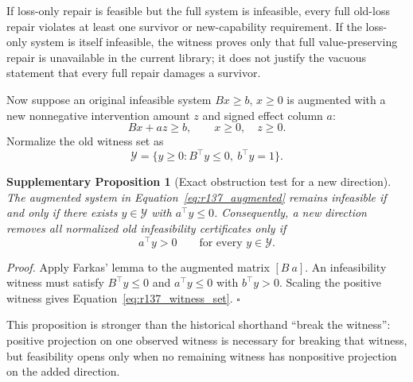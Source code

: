 \documentclass[11pt,letterpaper]{article}
\theoremstyle{plain}
\newtheorem{proposition}{Supplementary Proposition}
\newcommand{\1}{\mathbf 1}
\begin{document}
If loss-only repair is feasible but the full system is infeasible, every full old-loss repair violates at least one survivor or new-capability requirement. If the loss-only system is itself infeasible, the witness proves only that full value-preserving repair is unavailable in the current library; it does not justify the vacuous statement that every full repair damages a survivor.

Now suppose an original infeasible system $Bx\ge b$, $x\ge0$ is augmented with a new nonnegative intervention amount $z$ and signed effect column $a$:
\begin{equation}
 Bx+az\ge b,\qquad x\ge0,\quad z\ge0.
\label{eq:r137_augmented}
\end{equation}
Normalize the old witness set as
\begin{equation}
 \mathcal Y=\{y\ge0:B^\top y\le0,\ b^\top y=1\}.
\label{eq:r137_witness_set}
\end{equation}

\begin{proposition}[Exact obstruction test for a new direction]
The augmented system in Equation~\ref{eq:r137_augmented} remains infeasible if and only if there exists $y\in\mathcal Y$ with $a^\top y\le0$. Consequently, a new direction removes all normalized old infeasibility certificates only if
\begin{equation}
 a^\top y>0\qquad\text{for every }y\in\mathcal Y.
\label{eq:r137_break_all_witnesses}
\end{equation}
\end{proposition}
\textit{Proof.} Apply Farkas' lemma to the augmented matrix $[B\ a]$. An infeasibility witness must satisfy $B^\top y\le0$ and $a^\top y\le0$ with $b^\top y>0$. Scaling the positive witness gives Equation~\ref{eq:r137_witness_set}. $\square$

This proposition is stronger than the historical shorthand ``break the witness'': positive projection on one observed witness is necessary for breaking that witness, but feasibility opens only when no remaining witness has nonpositive projection on the added direction.
\end{document}
